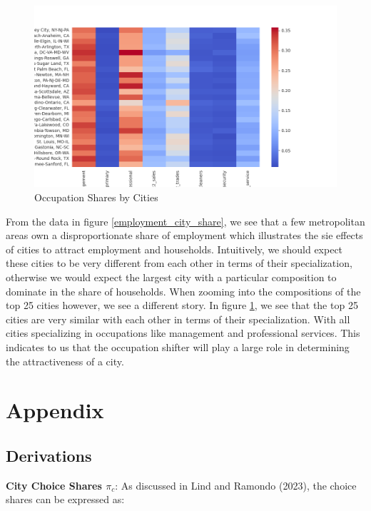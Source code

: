 \documentclass[10pt]{article}
\begin{document}
\begin{figure}[!htb]
    \centering
    \includegraphics[width=\textwidth]{../../estimations/graphs/top_25_city_heatmap.png}
    \caption{Occupation Shares by Cities}
    \label{top_25_city_heatmap}
\end{figure}

From the data in figure \ref{employment_city_share}, we see that a few metropolitan areas own a disproportionate share of employment which illustrates the sie effects of cities to attract employment and households. Intuitively, we should expect these cities to be very different from each other in terms of their specialization, otherwise we would expect the largest city with a particular composition to dominate in the share of households. When zooming into the compositions of the top 25 cities however, we see a different story. In figure \ref{top_25_city_heatmap}, we see that the top 25 cities are very similar with each other in terms of their specialization. With all cities specializing in occupations like management and professional services. This indicates to us that the occupation shifter will play a large role in determining the attractiveness of a city.

\newpage


\newpage

\section{Appendix}

\subsection{Derivations}

\noindent\textbf{City Choice Shares $\pi_{c}$}: As discussed in Lind and Ramondo (2023), the choice shares can be expressed as:
\end{document}
